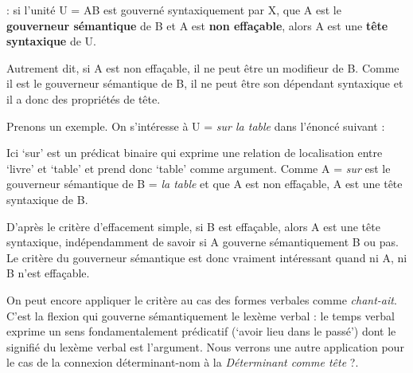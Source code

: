 \begin{styleLivreImportant}
: si l’unité U = AB est gouverné syntaxiquement par X, que A est le \textbf{gouverneur sémantique} de B et A est \textbf{non effaçable}, alors A est une \textbf{tête syntaxique} de U.
\end{styleLivreImportant}

Autrement dit, si A est non effaçable, il ne peut être un modifieur de B. Comme il est le gouverneur sémantique de B, il ne peut être son dépendant syntaxique et il a donc des propriétés de tête.

Prenons un exemple. On s’intéresse à U = \textit{sur la table} dans l’énoncé suivant :

\z

Ici ‘sur’ est un prédicat binaire qui exprime une relation de localisation entre ‘livre’ et ‘table’ et prend donc ‘table’ comme argument. Comme A = \textit{sur} est le gouverneur sémantique de B = \textit{la table} et que A est non effaçable, A est une tête syntaxique de B.

D’après le critère d’effacement simple, si B est effaçable, alors A est une tête syntaxique, indépendamment de savoir si A gouverne sémantiquement B ou pas. Le critère du gouverneur sémantique est donc vraiment intéressant quand ni A, ni B n’est effaçable.

On peut encore appliquer le critère au cas des formes verbales comme \textit{chant-ait}. C’est la flexion qui gouverne sémantiquement le lexème verbal : le temps verbal exprime un sens fondamentalement prédicatif (‘avoir lieu dans le passé’) dont le signifié du lexème verbal est l’argument. Nous verrons une autre application pour le cas de la connexion déterminant-nom à la  \textit{Déterminant comme tête} ?.

